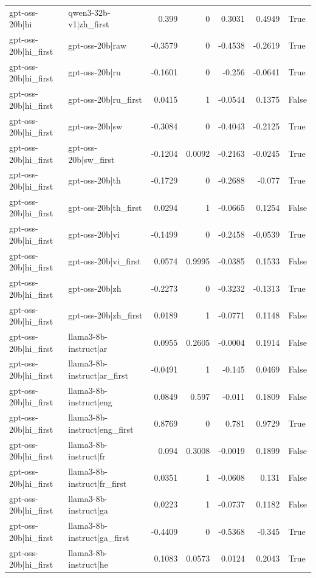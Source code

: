 \begin{table}
\begin{tabular}{l l r r r r l}
gpt-oss-20b|hi & qwen3-32b-v1|zh_first & 0.399 & 0 & 0.3031 & 0.4949 & True \\
gpt-oss-20b|hi_first & gpt-oss-20b|raw & -0.3579 & 0 & -0.4538 & -0.2619 & True \\
gpt-oss-20b|hi_first & gpt-oss-20b|ru & -0.1601 & 0 & -0.256 & -0.0641 & True \\
gpt-oss-20b|hi_first & gpt-oss-20b|ru_first & 0.0415 & 1 & -0.0544 & 0.1375 & False \\
gpt-oss-20b|hi_first & gpt-oss-20b|sw & -0.3084 & 0 & -0.4043 & -0.2125 & True \\
gpt-oss-20b|hi_first & gpt-oss-20b|sw_first & -0.1204 & 0.0092 & -0.2163 & -0.0245 & True \\
gpt-oss-20b|hi_first & gpt-oss-20b|th & -0.1729 & 0 & -0.2688 & -0.077 & True \\
gpt-oss-20b|hi_first & gpt-oss-20b|th_first & 0.0294 & 1 & -0.0665 & 0.1254 & False \\
gpt-oss-20b|hi_first & gpt-oss-20b|vi & -0.1499 & 0 & -0.2458 & -0.0539 & True \\
gpt-oss-20b|hi_first & gpt-oss-20b|vi_first & 0.0574 & 0.9995 & -0.0385 & 0.1533 & False \\
gpt-oss-20b|hi_first & gpt-oss-20b|zh & -0.2273 & 0 & -0.3232 & -0.1313 & True \\
gpt-oss-20b|hi_first & gpt-oss-20b|zh_first & 0.0189 & 1 & -0.0771 & 0.1148 & False \\
gpt-oss-20b|hi_first & llama3-8b-instruct|ar & 0.0955 & 0.2605 & -0.0004 & 0.1914 & False \\
gpt-oss-20b|hi_first & llama3-8b-instruct|ar_first & -0.0491 & 1 & -0.145 & 0.0469 & False \\
gpt-oss-20b|hi_first & llama3-8b-instruct|eng & 0.0849 & 0.597 & -0.011 & 0.1809 & False \\
gpt-oss-20b|hi_first & llama3-8b-instruct|eng_first & 0.8769 & 0 & 0.781 & 0.9729 & True \\
gpt-oss-20b|hi_first & llama3-8b-instruct|fr & 0.094 & 0.3008 & -0.0019 & 0.1899 & False \\
gpt-oss-20b|hi_first & llama3-8b-instruct|fr_first & 0.0351 & 1 & -0.0608 & 0.131 & False \\
gpt-oss-20b|hi_first & llama3-8b-instruct|ga & 0.0223 & 1 & -0.0737 & 0.1182 & False \\
gpt-oss-20b|hi_first & llama3-8b-instruct|ga_first & -0.4409 & 0 & -0.5368 & -0.345 & True \\
gpt-oss-20b|hi_first & llama3-8b-instruct|he & 0.1083 & 0.0573 & 0.0124 & 0.2043 & True \\

\end{tabular}
\end{table}
